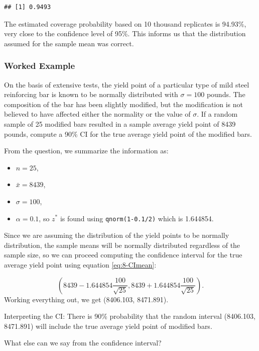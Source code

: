 \documentclass[
]{book}
\providecommand{\tightlist}{%
  \setlength{\itemsep}{0pt}\setlength{\parskip}{0pt}}
\begin{document}
\begin{verbatim}
## [1] 0.9493
\end{verbatim}

The estimated coverage probability based on 10 thousand replicates is 94.93\%, very close to the confidence level of 95\%. This informs us that the distribution assumed for the sample mean was correct.

\subsubsection{Worked Example}\label{worked-example-1}

On the basis of extensive tests, the yield point of a particular type of mild steel reinforcing bar is known to be normally distributed with \(\sigma=100\) pounds. The composition of the bar has been slightly modified, but the modification is not believed to have affected either the normality or the value of \(\sigma\). If a random sample of 25 modified bars resulted in a sample average yield point of 8439 pounds, compute a 90\% CI for the true average yield point of the modified bars.

From the question, we summarize the information as:

\begin{itemize}
\tightlist
\item
  \(n = 25\),
\item
  \(\bar{x} = 8439\),
\item
  \(\sigma = 100\),
\item
  \(\alpha = 0.1\), so \(z^*\) is found using \texttt{qnorm(1-0.1/2)} which is 1.644854.
\end{itemize}

Since we are assuming the distribution of the yield points to be normally distribution, the sample means will be normally distributed regardless of the sample size, so we can proceed computing the confidence interval for the true average yield point using equation \eqref{eq:8-CImean}:

\[
\left( 8439 - 1.644854 \frac{100}{\sqrt{25}} , 8439 + 1.644854 \frac{100}{\sqrt{25}} \right).
\]
Working everything out, we get (8406.103, 8471.891).

Interpreting the CI: There is 90\% probability that the random interval (8406.103, 8471.891) will include the true average yield point of modified bars.

What else can we say from the confidence interval?
\end{document}
